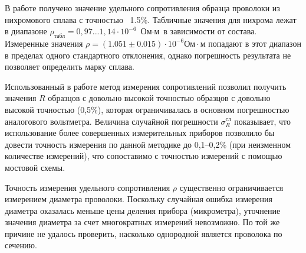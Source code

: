 \documentclass[a4paper, 12pt]{article}
\begin{document}
В работе получено значение удельного сопротивления образца проволоки из нихромового
сплава с точностью ~1.5\%. Табличные значения для нихрома лежат в диапазоне $\rho_{\text{табл}}= 0,97...1,14 \cdot 10^{-6}$ $\text{Ом} \cdot \text{м}$ в зависимости от состава. Измеренные значения $\rho=(1.051\pm0.015)\cdot 10^{-6} \text{Ом} \cdot \text{м}$ попадают в этот диапазон в пределах одного стандартного отклонения, однако погрешность результата не позволяет определить марку сплава.

Использованный в работе метод измерения сопротивлений позволил получить значения $R$ образцов с довольно высокой точностью образцов с довольно высокой точностью (0,5\%), которая ограничивалась в основном погрешностью аналогового вольтметра. Величина случайной погрешности $\sigma_R^\text{сл}$ показывает, что использование более совершенных измерительных приборов позволило бы довести точность измерения по данной методике до 0,1–0,2\% (при неизменном количестве измерений), что сопоставимо с точностью измерений с помощью мостовой схемы.

Точность измерения удельного сопротивления $\rho$ существенно ограничивается измерением
диаметра проволоки. Поскольку случайная ошибка измерения диаметра оказалась меньше
цены деления прибора (микрометра), уточнение значения диаметра за счет многократных измерений невозможно. По той же причине не удалось проверить, насколько однородной является проволока по сечению.
\end{document}
